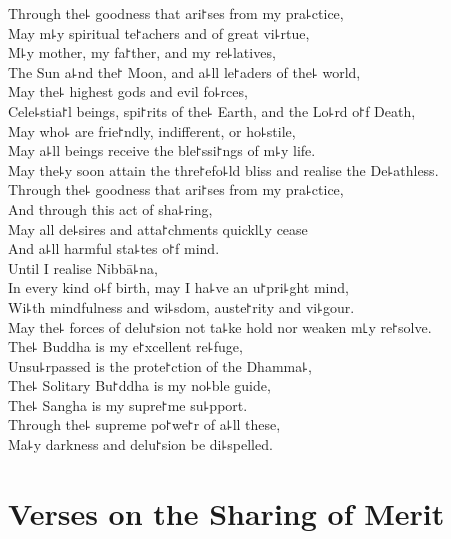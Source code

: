 Through the꜕ goodness that ari꜓ses from my pra꜕ctice,\\
May m꜕y spiritual te꜓achers and  of great vi꜕rtue,\\
M꜕y mother, my fa꜓ther, and my re꜕latives,\\
The Sun a꜕nd the꜓ Moon, and a꜕ll  le꜓aders of the꜕ world,\\
May the꜕ highest gods and evil fo꜕rces,\\
Cele꜕stia꜓l beings,  spi꜓rits of the꜕ Earth, and the Lo꜕rd o꜓f Death,\\
May  who꜕ are frie꜓ndly, indifferent, or ho꜕stile,\\
May a꜕ll beings receive the ble꜓ssi꜓ngs of m꜕y life.\\
May the꜕y soon attain the thre꜓efo꜕ld bliss and realise the De꜕athless.\\
Through the꜕ goodness that ari꜓ses from my pra꜕ctice,\\
And through this act of sha꜕ring,\\
May all de꜕sires and atta꜓chments quickl꜖y cease\\
And a꜕ll harmful sta꜕tes o꜓f mind.\\
Until I realise Nibbā꜕na,\\
In every kind o꜕f birth, may I ha꜕ve an u꜓pri꜕ght mind,\\
Wi꜕th mindfulness and wi꜕sdom, auste꜓rity and vi꜕gour.\\
May the꜕ forces of delu꜓sion not ta꜕ke hold nor weaken m꜖y re꜓solve.\\
The꜕ Buddha is my e꜓xcellent re꜕fuge,\\
Unsu꜕rpassed is the prote꜓ction of the Dhamma꜕,\\
The꜕ Solitary Bu꜓ddha is my no꜕ble guide,\\
The꜕ Sangha is my supre꜓me su꜕pport.\\
Through the꜕ supreme po꜓we꜓r of a꜕ll these,\\
Ma꜕y darkness and delu꜓sion be di꜕spelled.

\chapter[Sharing of Merit]{Verses on the Sharing of Merit}%

\begin{leader}
\end{leader}

